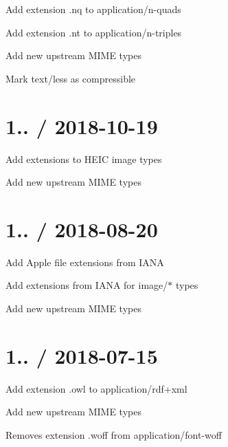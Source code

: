 
\begin{DoxyItemize}
\item Add extension {\ttfamily .nq} to {\ttfamily application/n-\/quads}
\item Add extension {\ttfamily .nt} to {\ttfamily application/n-\/triples}
\item Add new upstream M\+I\+ME types
\item Mark {\ttfamily text/less} as compressible
\end{DoxyItemize}

\section*{1.. / 2018-\/10-\/19 }


\begin{DoxyItemize}
\item Add extensions to H\+E\+IC image types
\item Add new upstream M\+I\+ME types
\end{DoxyItemize}

\section*{1.. / 2018-\/08-\/20 }


\begin{DoxyItemize}
\item Add Apple file extensions from I\+A\+NA
\item Add extensions from I\+A\+NA for {\ttfamily image/$\ast$} types
\item Add new upstream M\+I\+ME types
\end{DoxyItemize}

\section*{1.. / 2018-\/07-\/15 }


\begin{DoxyItemize}
\item Add extension {\ttfamily .owl} to {\ttfamily application/rdf+xml}
\item Add new upstream M\+I\+ME types
\begin{DoxyItemize}
\item Removes extension {\ttfamily .woff} from {\ttfamily application/font-\/woff}
\end{DoxyItemize}
\end{DoxyItemize}

